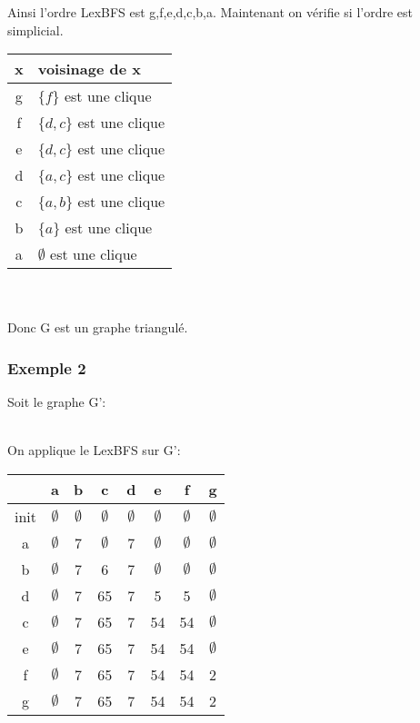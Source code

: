 \documentclass[12pt, a4paper]{report}
\begin{document}
 
 Ainsi l'ordre LexBFS est g,f,e,d,c,b,a. Maintenant on vérifie si l'ordre est simplicial.\\
 
 \begin{tabular}{| c | l |}
 \hline
    x & voisinage de x  \\
    \hline
    g & $\{f\}$ est une clique\\
    f & $\{d,c\}$ est une clique\\ 
    e & $\{d,c\}$ est une clique \\
    d & $\{a,c\}$ est une clique\\
    c & $\{a,b\}$ est une clique\\
    b & $\{a\}$ est une clique\\
    a & $\emptyset$ est une clique\\
    \hline
 \end{tabular}\\\\

 
 	Donc G est un graphe triangulé.\\
\newpage
\subsubsection{Exemple 2}
Soit le graphe G':\\

 \\

On applique le LexBFS sur G':\\

\begin{tabular}{ | c | c | c | c | c | c | c | c | }
	\hline
    & a & b & c & d & e & f & g \\
    \hline
   init& $\emptyset$ & $\emptyset$ & $\emptyset$ & $\emptyset$ & $\emptyset$ & $\emptyset$ & $\emptyset$ \\
  a & $\emptyset$ & 7 & $\emptyset$ & 7 & $\emptyset$ & $\emptyset$ & $\emptyset$ \\
  b & $\emptyset$ & 7 & 6 & 7 & $\emptyset$ & $\emptyset$ & $\emptyset$ \\
  d & $\emptyset$ & 7 & 65 & 7 & 5 & 5 & $\emptyset$ \\
  c & $\emptyset$ & 7 & 65 & 7 & 54 & 54 & $\emptyset$ \\
  e & $\emptyset$ & 7 & 65 & 7 & 54 & 54 & $\emptyset$ \\
  f & $\emptyset$ & 7 & 65 & 7 & 54 & 54 & 2\\
  g & $\emptyset$ & 7 & 65 & 7 & 54 & 54 & 2\\
  \hline
 \end{tabular}\\\\
 
\end{document}
